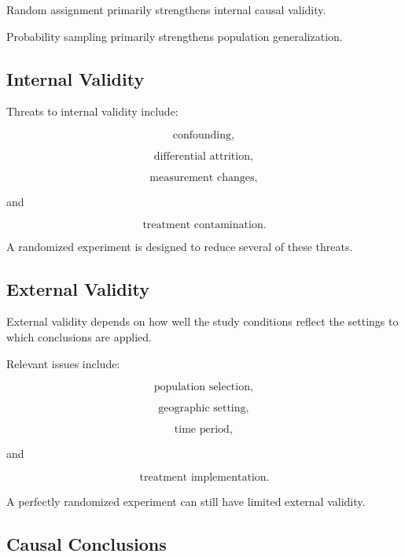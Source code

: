 Random assignment primarily strengthens internal causal validity.

Probability sampling primarily strengthens population generalization.

\subsection{Internal Validity}
\label{subsec:internal-validity}

Threats to internal validity include:

\[
\boxed{
\text{confounding},
}
\]

\[
\boxed{
\text{differential attrition},
}
\]

\[
\boxed{
\text{measurement changes},
}
\]

and

\[
\boxed{
\text{treatment contamination}.
}
\]

A randomized experiment is designed to reduce several of these threats.

\subsection{External Validity}
\label{subsec:external-validity}

External validity depends on how well the study conditions reflect the
settings to which conclusions are applied.

Relevant issues include:

\[
\boxed{
\text{population selection},
}
\]

\[
\boxed{
\text{geographic setting},
}
\]

\[
\boxed{
\text{time period},
}
\]

and

\[
\boxed{
\text{treatment implementation}.
}
\]

A perfectly randomized experiment can still have limited external
validity.

\subsection{Causal Conclusions}
\label{subsec:causal-conclusions-data-collection}

